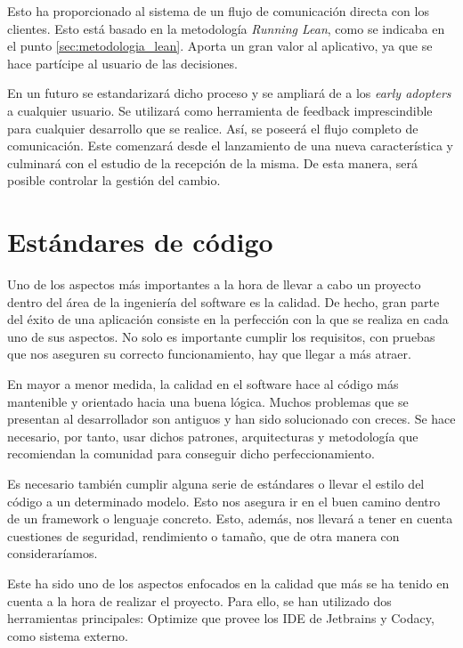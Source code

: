 Esto ha proporcionado al sistema de un flujo de comunicación directa con los clientes. Esto está basado en la metodología \textit{Running Lean}, como se indicaba en el punto \ref{sec:metodologia_lean}. Aporta un gran valor al aplicativo, ya que se hace partícipe al usuario de las decisiones.

En un futuro se estandarizará dicho proceso y se ampliará de a los \textit{early adopters} a cualquier usuario. Se utilizará como herramienta de feedback imprescindible para cualquier desarrollo que se realice. Así, se poseerá el flujo completo de comunicación. Este comenzará desde el lanzamiento de una nueva característica y culminará con el estudio de la recepción de la misma. De esta manera, será posible controlar la gestión del cambio.

\section{Estándares de código}\label{sec:estandares_codigo}

Uno de los aspectos más importantes a la hora de llevar a cabo un proyecto dentro del área de la ingeniería del software es la calidad. De hecho, gran parte del éxito de una aplicación consiste en la perfección con la que se realiza en cada uno de sus aspectos. No solo es importante cumplir los requisitos, con pruebas que nos aseguren su correcto funcionamiento, hay que llegar a más atraer.

En mayor a menor medida, la calidad en el software hace al código más mantenible y orientado hacia una buena lógica. Muchos problemas que se presentan al desarrollador son antiguos y han sido solucionado con creces. Se hace necesario, por tanto, usar dichos patrones, arquitecturas y metodología que recomiendan la comunidad para conseguir dicho perfeccionamiento.

Es necesario también cumplir alguna serie de estándares o llevar el estilo del código a un determinado modelo. Esto nos asegura ir en el buen camino dentro de un framework o lenguaje concreto. Esto, además, nos llevará a tener en cuenta cuestiones de seguridad, rendimiento o tamaño, que de otra manera con consideraríamos.


Este ha sido uno de los aspectos enfocados en la calidad que más se ha tenido en cuenta a la hora de realizar el proyecto. Para ello, se han utilizado dos herramientas principales: Optimize que provee los IDE de Jetbrains y Codacy, como sistema externo.

